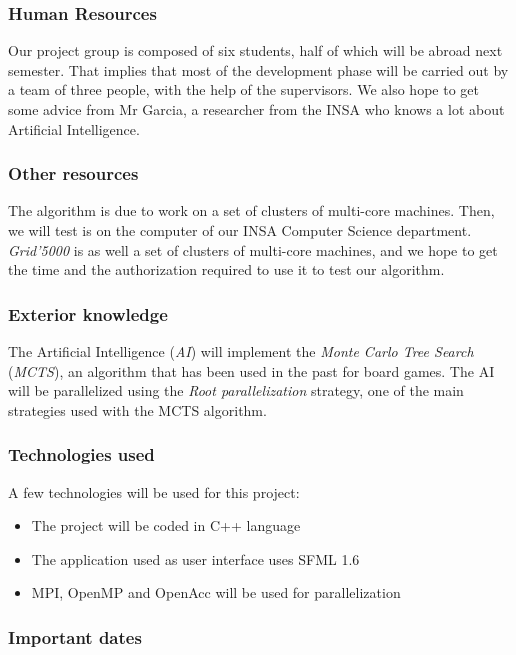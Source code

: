 \subsubsection{Human Resources}

Our project group is composed of six students, half of which will be abroad next semester.
That implies that most of the development phase will be carried out by a team of three people, with the help of the supervisors.
We also hope to get some advice from Mr Garcia, a researcher from the INSA who knows a lot about Artificial Intelligence.

\subsubsection{Other resources}

The algorithm is due to work on a set of clusters of multi-core machines. Then, we will test is on the computer of our INSA Computer Science department.
\emph{Grid'5000} is as well a set of clusters of multi-core machines, and we hope to get the time and the authorization required to use it to test our algorithm.

\subsubsection{Exterior knowledge}

The Artificial Intelligence (\emph{AI}) will implement the \emph{Monte Carlo Tree Search} (\emph{MCTS}), an algorithm that has been used in the past for board games.
The AI will be parallelized using the \emph{Root parallelization} strategy, one of the main strategies used with the MCTS algorithm.

\subsubsection{Technologies used}

A few technologies will be used for this project:
\begin{itemize}
	\item The project will be coded in C++ language
	\item The application used as user interface uses SFML 1.6
	\item MPI, OpenMP and OpenAcc will be used for parallelization
\end{itemize}

\subsubsection{Important dates}

